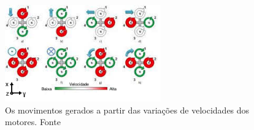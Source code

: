 \documentclass{beamer}
\begin{document}
\begin{frame}[allowframebreaks]
\begin{itemize}
	
	\framebreak
	
		
		\begin{figure}
			\centering
			\includegraphics[keepaspectratio = true,
			width=0.6\textwidth]{img/motores.jpeg}
			\caption{Os movimentos gerados a partir das variações de velocidades dos motores. Fonte \cite{Domingues2009}}
			\label{fig:diag quad3}
		\end{figure}
	
	\end{itemize}	
	
\end{frame}	 
\end{document}
